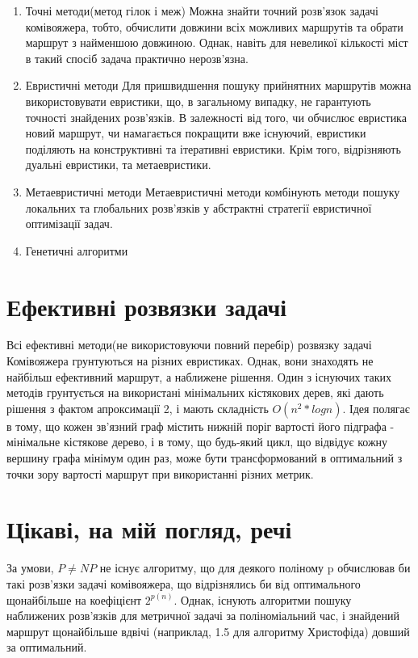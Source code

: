 \begin{enumerate}
    \item Точні методи(метод гілок і меж)
    Можна знайти точний розв'язок задачі комівояжера, тобто,
    обчислити довжини всіх можливих маршрутів та обрати маршрут з найменшою довжиною.
    Однак, навіть для невеликої кількості міст в такий спосіб задача практично нерозв'язна. 
    \item Евристичні методи
    Для пришвидшення пошуку прийнятних маршрутів можна використовувати евристики, що,
    в загальному випадку, не гарантують точності знайдених розв'язків. В залежності від того,
    чи обчислює евристика новий маршрут, чи намагається покращити вже існуючий, евристики поділяють
    на конструктивні та ітеративні евристики. Крім того, відрізняють дуальні евристики, та метаевристики. 
    \item Метаевристичні методи
    Метаевристичні методи комбінують методи пошуку локальних та глобальних розв'язків у
    абстрактні стратегії евристичної оптимізації задач.
    \item Генетичні алгоритми
\end{enumerate}

\section{Ефективні розвязки задачі}

Всі ефективні методи(не використовуючи повний перебір) розвязку задачі Комівояжера грунтуються на різних евристиках.
Однак, вони знаходять не найбільш ефективний маршрут, а наближене рішення. Один з існуючих таких методів
грунтується на використані мінімальних кістякових дерев, які дають рішення з фактом апроксимації 2, і мають складність
$O(n^2 * logn)$. Ідея полягає в тому, що кожен зв'язний граф містить нижній поріг вартості його підграфа
- мінімальне кістякове дерево, і в тому, що будь-який цикл, що відвідує кожну вершину графа мінімум один раз,
може бути трансформований в оптимальний з точки зору вартості маршрут при використанні різних метрик.

\section{Цікаві, на мій погляд, речі}

За умови, $P\neq NP$ не існує алгоритму, що для деякого поліному p обчислював би такі розв'язки задачі комівояжера,
що відрізнялись би від оптимального щонайбільше на коефіцієнт $2^{p(n)}$.
Однак, існують алгоритми пошуку наближених розв'язків для метричної задачі за поліноміальний час, і
знайдений маршрут щонайбільше вдвічі (наприклад, 1.5 для алгоритму Христофіда) довший за оптимальний. 